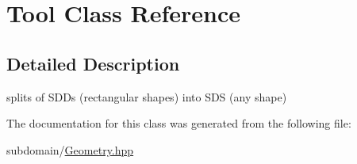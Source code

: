 \hypertarget{classTool}{
\section{Tool Class Reference}
\label{classTool}
}


\subsection{Detailed Description}
splits of SDDs (rectangular shapes) into SDS (any shape) 

The documentation for this class was generated from the following file:\begin{DoxyCompactItemize}
\item 
subdomain/\hyperlink{Geometry_8hpp}{Geometry.hpp}\end{DoxyCompactItemize}
